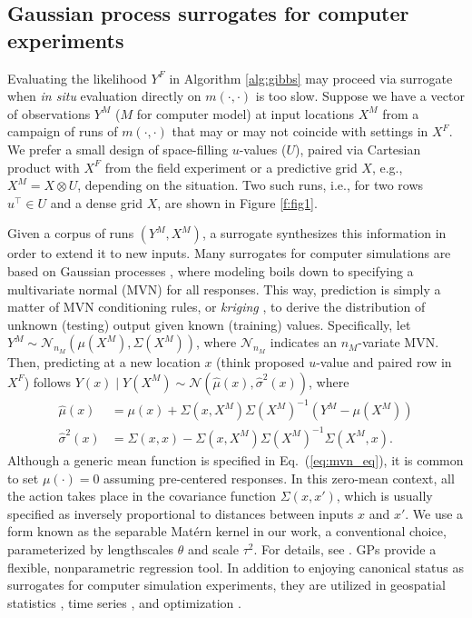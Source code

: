 \documentclass[11pt]{article}
\begin{document}
\subsection{Gaussian process surrogates for computer experiments}
\label{sec:gp_surr}

Evaluating the likelihood $Y^F$ in Algorithm \ref{alg:gibbs} may proceed via
surrogate when {\em in situ} evaluation directly on $m(\cdot, \cdot)$ is too
slow. Suppose we have a vector of observations $Y^M$ ($M$ for computer model) at
input locations $X^M$ from a campaign of runs of $m(\cdot, \cdot)$ that may or
may not coincide with settings in $X^F$. We prefer a small design of
space-filling $u$-values ($U$), paired via Cartesian product with $X^F$ from the
field experiment or a predictive grid $X$, e.g., $X^M = X \otimes U$, depending
on the situation. Two such runs, i.e., for two rows $u^\top \in U$ and a dense
grid $X$, are shown in Figure \ref{f:fig1}.

Given a corpus of runs $(Y^M, X^M)$, a surrogate synthesizes this information
in order to extend it to new inputs.  Many surrogates for computer
simulations are based on Gaussian processes
\citep[e.g.,][]{rasmussen2003gaussian}, where modeling boils down to
specifying a multivariate normal (MVN) for all responses.  This way,
prediction is simply a matter of MVN conditioning rules, or {\em kriging}
\citep{matheron1963principles}, to derive the distribution of unknown
(testing) output given known (training) values. Specifically, let $Y^M
\sim \mathcal{N}_{n_M}(\mu(X^M), \Sigma(X^M))$, where $\mathcal{N}_{n_M}$
indicates an $n_M$-variate MVN. Then, predicting at a new location $x$ (think
proposed $u$-value and paired row in $X^F$) follows $Y(x) \mid Y(X^M) \sim
\mathcal{N}(\hat{\mu}(x), \hat{\sigma}^2(x))$, where
\begin{align}
\hat{\mu}(x) &= \mu(x) + \Sigma(x, X^M) \Sigma(X^M)^{-1} (Y^M - \mu(X^M)) \label{eq:mvn_eq}\\
\hat{\sigma}^2(x) &= \Sigma(x, x) - \Sigma(x, X^M) \Sigma(X^M)^{-1} \Sigma(X^M, x). \nonumber
\end{align}
Although a generic mean function is specified in Eq.~(\ref{eq:mvn_eq}), it is
common to set $\mu(\cdot)=0$ assuming pre-centered responses. In this zero-mean
context, all the action takes place in the covariance function $\Sigma(x, x')$,
which is usually specified as inversely proportional to distances between inputs
$x$ and $x'$. We use a form known as the separable Mat\'ern kernel
\citep{stein1999interpolation} in our work, a conventional choice, parameterized
by lengthscales $\theta$ and scale $\tau^2$. For details, see \citet[][Chapter
5]{gramacy2020surrogates}. GPs provide a flexible, nonparametric regression
tool. In addition to enjoying canonical status as surrogates for computer
simulation experiments, they are utilized in geospatial statistics
\citep{cressie2011statistics}, time series \citep{roberts2013gaussian}, and
optimization \citep{jones1998efficient}.
\end{document}
